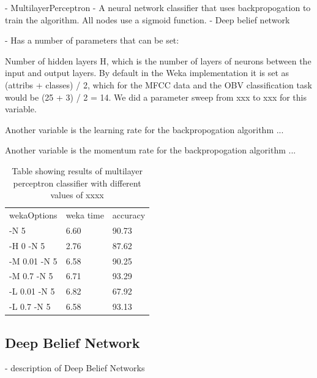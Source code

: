 \documentclass[12pt,oneside]{book}
\begin{document}
%
%

- MultilayerPerceptron - A neural network classifier that uses
backpropogation to train the algorithm.  All nodes use a sigmoid
function.
- Deep belief network 

- Has a number of parameters that can be set:

Number of hidden layers H, which is the number of layers of neurons
between the input and output layers.  By default in the Weka
implementation it is set as (attribs + classes) / 2, which for the
MFCC data and the OBV classification task would be (25 + 3) / 2 = 14.
We did a parameter sweep from xxx to xxx for this variable.

Another variable is the learning rate for the backpropogation
algorithm ...

Another variable is the momentum rate for the backpropogation
algorithm ...

\begin{table}
\begin{tabular}{|l|l|l|}
\hline

wekaOptions          & weka time       &accuracy        \\
-N 5                 & 6.60            & 90.73           \\
-H 0 -N 5            & 2.76            & 87.62           \\
-M 0.01 -N 5         & 6.58            & 90.25           \\
-M 0.7 -N 5          & 6.71            & 93.29           \\
-L 0.01 -N 5         & 6.82            & 67.92           \\
-L 0.7 -N 5          & 6.58            & 93.13           \\


\hline
\end{tabular}
\caption{Table showing results of multilayer perceptron classifier with
  different values of xxxx}
\label{table:obv-14-multilayerPerceptron}
\end{table}






%
%

\subsection{Deep Belief Network}


- description of Deep Belief Networks
\end{document}
